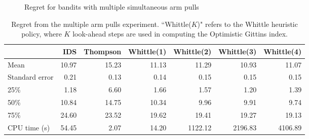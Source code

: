 \begin{figure}
	\centering
	
	\caption{Regret for bandits with multiple simultaneous arm pulls}
	\label{fig:restless1}
\end{figure}

\begin{table}
	\centering
	
	{
	\begin{tabular}{lrrrrrr}
		\toprule
		{} &    IDS &  Thompson &  Whittle(1) &  Whittle(2) &  Whittle(3) &  Whittle(4) \\
		\midrule
		Mean           &  10.97 &     15.23 &       11.13 &       11.29 &       10.93 &       11.07 \\
		Standard error &   0.21 &      0.13 &        0.14 &        0.15 &        0.15 &        0.15 \\
		25\%            &   1.18 &      6.60 &        1.66 &        1.57 &        1.20 &        1.39 \\
		50\%            &  10.84 &     14.75 &       10.34 &        9.96 &        9.91 &        9.74 \\
		75\%            &  24.60 &     23.52 &       19.62 &       19.41 &       19.27 &       19.13 \\
		CPU time (s)   & 54.45 &      2.07 &       14.20 &     1122.12 &     2196.83 &     4106.89 \\
		\bottomrule
	\end{tabular}
	}
	\caption{Regret from the multiple arm pulls experiment. ``Whittle($K$)" refers to the Whittle heuristic policy, where $K$ look-ahead steps are used in computing the Optimistic Gittins index.}
	\label{table:restless1_summary}

	
\end{table}
